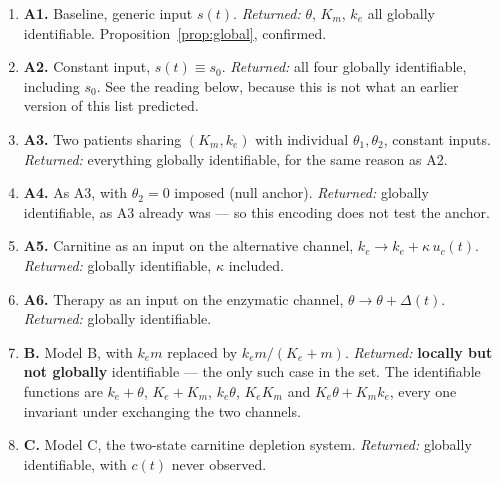 \documentclass[11pt,a4paper]{article}
\begin{document}
\begin{enumerate}[leftmargin=*, itemsep=2pt]
\item \textbf{A1.} Baseline, generic input $s(t)$. \emph{Returned:} $\theta$, $K_m$, $k_e$
      all globally identifiable. Proposition~\ref{prop:global}, confirmed.
\item \textbf{A2.} Constant input, $s(t) \equiv s_0$. \emph{Returned:} all four globally
      identifiable, including $s_0$. See the reading below, because this is not what an
      earlier version of this list predicted.
\item \textbf{A3.} Two patients sharing $(K_m, k_e)$ with individual $\theta_1, \theta_2$,
      constant inputs. \emph{Returned:} everything globally identifiable, for the same
      reason as A2.
\item \textbf{A4.} As A3, with $\theta_2 = 0$ imposed (null anchor). \emph{Returned:}
      globally identifiable, as A3 already was --- so this encoding does not test the
      anchor.
\item \textbf{A5.} Carnitine as an input on the alternative channel,
      $k_e \to k_e + \kappa\, u_c(t)$. \emph{Returned:} globally identifiable, $\kappa$
      included.
\item \textbf{A6.} Therapy as an input on the enzymatic channel,
      $\theta \to \theta + \Delta(t)$. \emph{Returned:} globally identifiable.
\item \textbf{B.} Model B, with $k_e m$ replaced by $k_e m/(K_e + m)$. \emph{Returned:}
      \textbf{locally but not globally} identifiable --- the only such case in the set. The
      identifiable functions are $k_e + \theta$, $K_e + K_m$, $k_e\theta$, $K_e K_m$ and
      $K_e\theta + K_m k_e$, every one invariant under exchanging the two channels.
\item \textbf{C.} Model C, the two-state carnitine depletion system. \emph{Returned:}
      globally identifiable, with $c(t)$ never observed.
\end{enumerate}
\end{document}
